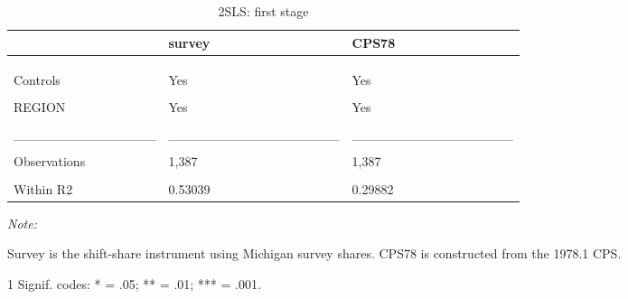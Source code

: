 \begin{table}

\caption{\label{tab:table:2sls:stage1:noloo}2SLS: first stage}
\centering
\begin{threeparttable}
\begin{tabular}[t]{lll}
\toprule
  & survey & CPS78\\
\midrule
\cellcolor{gray!6}{Dependent Var.:} & \cellcolor{gray!6}{pe} & \cellcolor{gray!6}{pe}\\
\addlinespace
 &  & \\
\addlinespace
\cellcolor{gray!6}{Bartik} & \cellcolor{gray!6}{0.9659*** (0.0276)} & \cellcolor{gray!6}{1.373*** (0.1135)}\\
\addlinespace
Controls & Yes & Yes\\
\addlinespace
\cellcolor{gray!6}{Fixed-Effects:} & \cellcolor{gray!6}{------------------} & \cellcolor{gray!6}{-----------------}\\
\addlinespace
REGION & Yes & Yes\\
\addlinespace
\cellcolor{gray!6}{TIME} & \cellcolor{gray!6}{Yes} & \cellcolor{gray!6}{Yes}\\
\addlinespace
\_\_\_\_\_\_\_\_\_\_\_\_\_\_\_ & \_\_\_\_\_\_\_\_\_\_\_\_\_\_\_\_\_\_ & \_\_\_\_\_\_\_\_\_\_\_\_\_\_\_\_\_\\
\addlinespace
\cellcolor{gray!6}{S.E. type} & \cellcolor{gray!6}{Drisco.-Kra. (L=4)} & \cellcolor{gray!6}{Drisc.-Kra. (L=4)}\\
\addlinespace
Observations & 1,387 & 1,387\\
\addlinespace
\cellcolor{gray!6}{R2} & \cellcolor{gray!6}{0.89304} & \cellcolor{gray!6}{0.84030}\\
\addlinespace
Within R2 & 0.53039 & 0.29882\\
\bottomrule
\end{tabular}
\begin{tablenotes}
\item \textit{Note: } 
\item Survey is the shift-share instrument using Michigan survey shares. CPS78 is constructed from the 1978.1 CPS.
\item[1] Signif. codes: * = .05; ** = .01; *** = .001.
\end{tablenotes}
\end{threeparttable}
\end{table}
